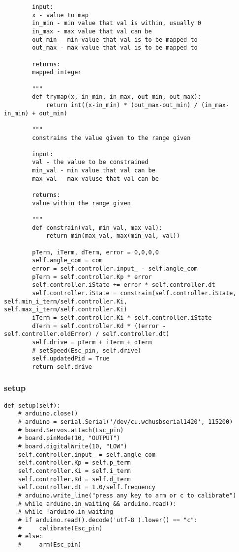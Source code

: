 \documentclass[11pt]{article}
\begin{document}
\begin{verbatim}
        input:
        x - value to map
        in_min - min value that val is within, usually 0
        in_max - max value that val can be
        out_min - min value that val is to be mapped to
        out_max - max value that val is to be mapped to

        returns:
        mapped integer

        """
        def trymap(x, in_min, in_max, out_min, out_max):
            return int((x-in_min) * (out_max-out_min) / (in_max-in_min) + out_min)

        """
        constrains the value given to the range given

        input:
        val - the value to be constrained
        min_val - min value that val can be
        max_val - max valuse that val can be

        returns:
        value within the range given

        """
        def constrain(val, min_val, max_val):
            return min(max_val, max(min_val, val))

        pTerm, iTerm, dTerm, error = 0,0,0,0
        self.angle_com = com
        error = self.controller.input_ - self.angle_com
        pTerm = self.controller.Kp * error
        self.controller.iState += error * self.controller.dt
        self.controller.iState = constrain(self.controller.iState, self.min_i_term/self.controller.Ki, self.max_i_term/self.controller.Ki)
        iTerm = self.controller.Ki * self.controller.iState
        dTerm = self.controller.Kd * ((error - self.controller.oldError) / self.controller.dt)
        self.drive = pTerm + iTerm + dTerm
        # setSpeed(Esc_pin, self.drive)
        self.updatedPid = True
        return self.drive
\end{verbatim}

\subsubsection{setup}
\label{sec:org9b5d669}
\begin{verbatim}
def setup(self):
    # arduino.close()
    # arduino = serial.Serial('/dev/cu.wchusbserial1420', 115200)
    # board.Servos.attach(Esc_pin)
    # board.pinMode(10, "OUTPUT")
    # board.digitalWrite(10, "LOW")
    self.controller.input_ = self.angle_com
    self.controller.Kp = self.p_term
    self.controller.Ki = self.i_term
    self.controller.Kd = self.d_term
    self.controller.dt = 1.0/self.frequency
    # arduino.write_line("press any key to arm or c to calibrate")
    # while arduino.in_waiting && arduino.read():
    # while !arduino.in_waiting
    # if arduino.read().decode('utf-8').lower() == "c":
    #     calibrate(Esc_pin)
    # else:
    #     arm(Esc_pin)
\end{verbatim}
\end{document}
